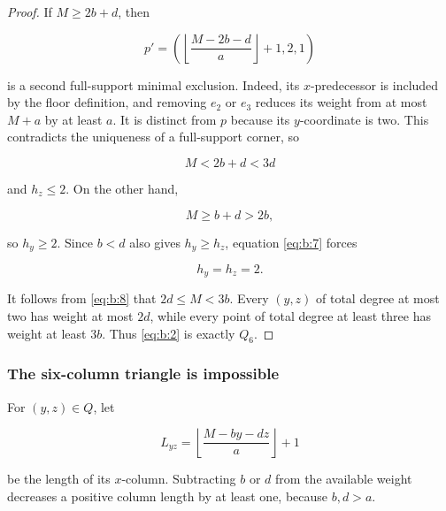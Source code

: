 \begin{proof}
If \(M\ge2b+d\), then

\[
p'=
\left(
\left\lfloor\frac{M-2b-d}{a}\right\rfloor+1,
2,1
\right)
\]

is a second full-support minimal exclusion. Indeed, its \(x\)-predecessor is
included by the floor definition, and removing \(e_2\) or \(e_3\) reduces
its weight from at most \(M+a\) by at least \(a\). It is distinct from
\(p\) because its \(y\)-coordinate is two. This contradicts the uniqueness
of a full-support corner, so

\[
M<2b+d<3d
\]

and \(h_z\le2\). On the other hand,

\[
M\ge b+d>2b,
\]

so \(h_y\ge2\). Since \(b<d\) also gives \(h_y\ge h_z\), equation \eqref{eq:b:7}
forces

\begin{equation}
h_y=h_z=2.
\label{eq:b:8}
\end{equation}

It follows from \eqref{eq:b:8} that \(2d\le M<3b\). Every \((y,z)\) of total degree at
most two has weight at most \(2d\), while every point of total degree at
least three has weight at least \(3b\). Thus \eqref{eq:b:2} is exactly \(Q_6\).

\end{proof}

\subsubsection{The six-column triangle is impossible}

For \((y,z)\in Q\), let

\begin{equation}
L_{yz}=\left\lfloor\frac{M-by-dz}{a}\right\rfloor+1
\label{eq:b:9}
\end{equation}

be the length of its \(x\)-column. Subtracting \(b\) or \(d\) from the
available weight decreases a positive column length by at least one, because
\(b,d>a\).

